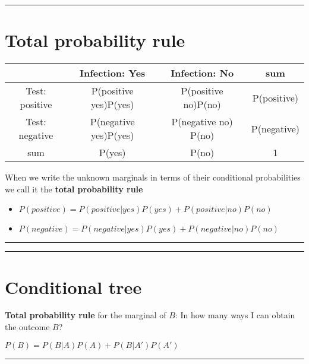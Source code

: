 \documentclass[
]{book}
\providecommand{\tightlist}{%
  \setlength{\itemsep}{0pt}\setlength{\parskip}{0pt}}
\begin{document}
\begin{center}\rule{0.5\linewidth}{0.5pt}\end{center}

\hypertarget{total-probability-rule}{%
\section{Total probability rule}\label{total-probability-rule}}

\begin{longtable}[]{@{}cccc@{}}
\toprule
& Infection: Yes & Infection: No & sum \\
\midrule
\endhead
Test: positive & P(positive {\textbar{}} yes)P(yes) & P(positive {\textbar{}} no)P(no) & P(positive) \\
Test: negative & P(negative {\textbar{}} yes)P(yes) & P(negative {\textbar{}} no) P(no) & P(negative) \\
sum & P(yes) & P(no) & 1 \\
\bottomrule
\end{longtable}

When we write the unknown marginals in terms of their conditional probabilities we call it the \textbf{total probability rule}

\begin{itemize}
\tightlist
\item
  \(P(positive)=P(positive|yes)P(yes)+P(positive|no)P(no)\)
\item
  \(P(negative)=P(negative|yes)P(yes)+P(negative|no)P(no)\)
\end{itemize}

\begin{center}\rule{0.5\linewidth}{0.5pt}\end{center}

\begin{center}\rule{0.5\linewidth}{0.5pt}\end{center}

\hypertarget{conditional-tree-1}{%
\section{Conditional tree}\label{conditional-tree-1}}

\textbf{Total probability rule} for the marginal of \(B\): In how many ways I can obtain the outcome \(B\)?

\(P(B)=P(B|A)P(A)+P(B|A')P(A')\)

\begin{center}\rule{0.5\linewidth}{0.5pt}\end{center}
\end{document}

